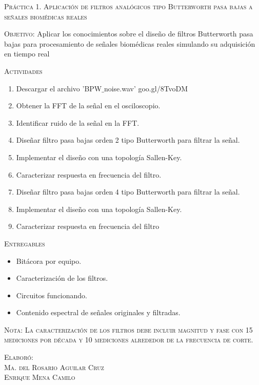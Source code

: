 \documentclass[10pt,letterpaper,spanish,twoside]{report}
\begin{document}
\docdate

\begin{center}
 \textsc{\asignatura}\vspace{.2em}
\end{center}

\textsc{Práctica 1. Aplicación de filtros analógicos tipo Butterworth pasa bajas a señales biomédicas reales}

\textsc{Objetivo:} Aplicar los conocimientos sobre el diseño de filtros Butterworth pasa bajas para procesamiento de señales biomédicas reales simulando su adquisición en tiempo real

\textsc{Actividades}
\begin{enumerate}
  \item Descargar el archivo 'BPW$\_$noise.wav' goo.gl/8TvoDM
  \item Obtener la FFT de la señal en el osciloscopio.
  \item Identificar ruido de la señal en la FFT.
  \item Diseñar filtro pasa bajas orden 2 tipo Butterworth para filtrar la señal.
  \item Implementar el diseño con una topología Sallen-Key.
  \item Caracterizar respuesta en frecuencia del filtro.
  \item Diseñar filtro pasa bajas orden 4 tipo Butterworth para filtrar la señal.
  \item Implementar el diseño con una topología Sallen-Key.
  \item Caracterizar respuesta en frecuencia del filtro 
\end{enumerate}

\textsc{Entregables}
\begin{itemize}
  \item Bitácora por equipo.
  \item Caracterización de los filtros.
  \item Circuitos funcionando.
  \item Contenido espectral de señales originales y filtradas.
\end{itemize}

\textsc{Nota: La caracterización de los filtros debe incluir magnitud y fase con 15 mediciones por década y 10 mediciones alrededor de la frecuencia de corte.}
\vfill
\begin{flushright}
\textsc{Elaboró:\\
Ma. del Rosario Aguilar Cruz\\
Enrique Mena Camilo}
\end{flushright}
\end{document}
